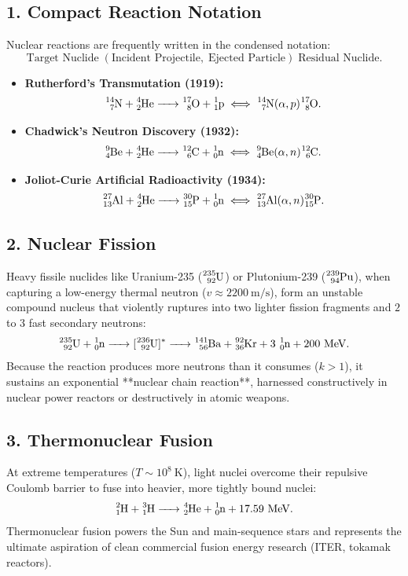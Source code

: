\subsection{1. Compact Reaction Notation}
Nuclear reactions are frequently written in the condensed notation:
\begin{equation}
\text{Target Nuclide}\;(\text{Incident Projectile},\;\text{Ejected Particle})\;\text{Residual Nuclide}.
\end{equation}
\begin{itemize}[leftmargin=1.5em,itemsep=3pt]
  \item \textbf{Rutherford's Transmutation (1919):}
  \[
  \ce{^{14}_7N + ^4_2He -> ^{17}_8O + ^1_1p} \iff \ce{^{14}_7N}(\alpha, p)\ce{^{17}_8O}.
  \]
  \item \textbf{Chadwick's Neutron Discovery (1932):}
  \[
  \ce{^9_4Be + ^4_2He -> ^{12}_6C + ^1_0n} \iff \ce{^9_4Be}(\alpha, n)\ce{^{12}_6C}.
  \]
  \item \textbf{Joliot-Curie Artificial Radioactivity (1934):}
  \[
  \ce{^{27}_{13}Al + ^4_2He -> ^{30}_{15}P + ^1_0n} \iff \ce{^{27}_{13}Al}(\alpha, n)\ce{^{30}_{15}P}.
  \]
\end{itemize}

\subsection{2. Nuclear Fission}
Heavy fissile nuclides like Uranium-235 ($\ce{^{235}_{92}U}$) or Plutonium-239 ($\ce{^{239}_{94}Pu}$), when capturing a low-energy thermal neutron ($v \approx 2200\ \mathrm{m/s}$), form an unstable compound nucleus that violently ruptures into two lighter fission fragments and $2$ to $3$ fast secondary neutrons:
\begin{equation}
\ce{^{235}_{92}U + ^1_0n -> [^{236}_{92}U]^* -> ^{141}_{56}Ba + ^{92}_{36}Kr + 3\,^1_0n} + 200\ \mathrm{MeV}.
\end{equation}
Because the reaction produces more neutrons than it consumes ($k > 1$), it sustains an exponential **nuclear chain reaction**, harnessed constructively in nuclear power reactors or destructively in atomic weapons.

\subsection{3. Thermonuclear Fusion}
At extreme temperatures ($T \sim 10^8\ \mathrm{K}$), light nuclei overcome their repulsive Coulomb barrier to fuse into heavier, more tightly bound nuclei:
\begin{equation}
\ce{^2_1H + ^3_1H -> ^4_2He + ^1_0n} + 17.59\ \mathrm{MeV}.
\end{equation}
Thermonuclear fusion powers the Sun and main-sequence stars and represents the ultimate aspiration of clean commercial fusion energy research (ITER, tokamak reactors).

